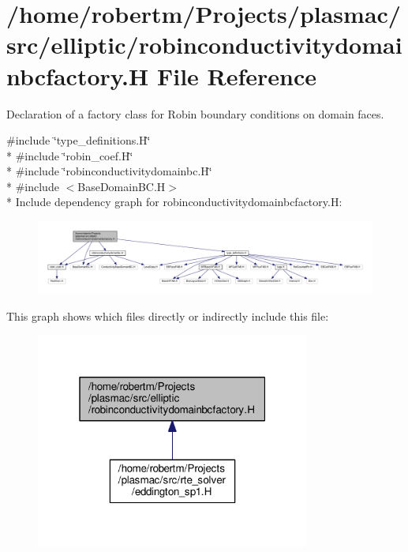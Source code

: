 \hypertarget{robinconductivitydomainbcfactory_8H}{}\section{/home/robertm/\+Projects/plasmac/src/elliptic/robinconductivitydomainbcfactory.H File Reference}
\label{robinconductivitydomainbcfactory_8H}


Declaration of a factory class for Robin boundary conditions on domain faces.  


{\ttfamily \#include \char`\"{}type\+\_\+definitions.\+H\char`\"{}}\\*
{\ttfamily \#include \char`\"{}robin\+\_\+coef.\+H\char`\"{}}\\*
{\ttfamily \#include \char`\"{}robinconductivitydomainbc.\+H\char`\"{}}\\*
{\ttfamily \#include $<$Base\+Domain\+B\+C.\+H$>$}\\*
Include dependency graph for robinconductivitydomainbcfactory.\+H\+:\nopagebreak
\begin{figure}[H]
\begin{center}
\leavevmode
\includegraphics[width=350pt]{robinconductivitydomainbcfactory_8H__incl}
\end{center}
\end{figure}
This graph shows which files directly or indirectly include this file\+:\nopagebreak
\begin{figure}[H]
\begin{center}
\leavevmode
\includegraphics[width=256pt]{robinconductivitydomainbcfactory_8H__dep__incl}
\end{center}
\end{figure}
